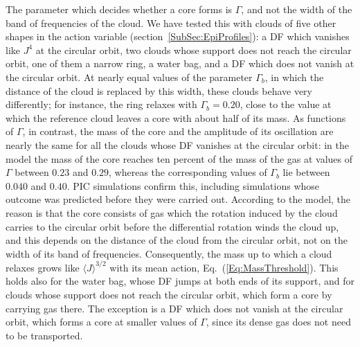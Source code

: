 The parameter which decides whether a core forms is $\Gamma$, and not the width of the band of frequencies of the cloud. We have tested this with clouds of five other shapes in the action variable (section~\ref{SubSec:EpiProfiles}): a DF which vanishes like $J^4$ at the circular orbit, two clouds whose support does not reach the circular orbit, one of them a narrow ring, a water bag, and a DF which does not vanish at the circular orbit. At nearly equal values of the parameter $\Gamma_b$, in which the distance of the cloud is replaced by this width, these clouds behave very differently; for instance, the ring relaxes with $\Gamma_b = 0.20$, close to the value at which the reference cloud leaves a core with about half of its mass. As functions of $\Gamma$, in contrast, the mass of the core and the amplitude of its oscillation are nearly the same for all the clouds whose DF vanishes at the circular orbit: in the model the mass of the core reaches ten percent of the mass of the gas at values of $\Gamma$ between $0.23$ and $0.29$, whereas the corresponding values of $\Gamma_b$ lie between $0.040$ and $0.40$. PIC simulations confirm this, including simulations whose outcome was predicted before they were carried out. According to the model, the reason is that the core consists of gas which the rotation induced by the cloud carries to the circular orbit before the differential rotation winds the cloud up, and this depends on the distance of the cloud from the circular orbit, not on the width of its band of frequencies. Consequently, the mass up to which a cloud relaxes grows like $\langle J\rangle^{3/2}$ with its mean action, Eq.~(\ref{Eq:MassThreshold}). This holds also for the water bag, whose DF jumps at both ends of its support, and for clouds whose support does not reach the circular orbit, which form a core by carrying gas there. The exception is a DF which does not vanish at the circular orbit, which forms a core at smaller values of $\Gamma$, since its dense gas does not need to be transported.

